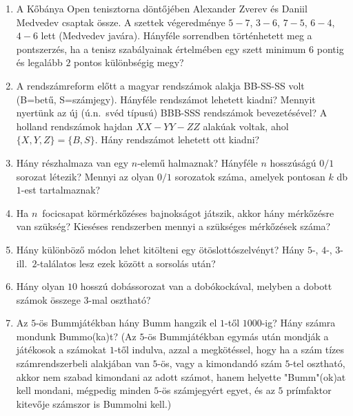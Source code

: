 \documentclass[a4paper,12pt]{article}
\begin{document}
\begin{enumerate}
        \item A Kőbánya Open tenisztorna döntőjében Alexander Zverev és Daniil Medvedev csaptak össze. A szettek végeredménye $5-7$, $3-6$, $7-5$, $6-4$, $4-6$ lett (Medvedev javára). Hányféle sorrendben történhetett meg a pontszerzés, ha a tenisz szabályainak értelmében egy szett minimum $6$ pontig és legalább $2$ pontos különbségig megy?

        \item
        A rendszámreform előtt a magyar rendszámok alakja BB-SS-SS volt (B=betű,
        S=számjegy). 
        Hányféle rendszámot lehetett kiadni? Mennyit nyertünk az új (ú.n.\ svéd
        típusú) BBB-SSS rendszámok bevezetésével? A holland rendszámok hajdan $XX-YY-ZZ$
        alakúak voltak, ahol $\{X,Y,Z\}=\{B,S\}$. Hány rendszámot lehetett ott kiadni?

        \item
        Hány részhalmaza van egy $n$-elemű halmaznak? Hányféle $n$ hosszúságú $0/1$
        sorozat létezik? Mennyi az olyan $0/1$ sorozatok száma, amelyek pontosan $k$
        db $1$-est tartalmaznak?

        \item
        Ha $n$\ focicsapat körmérkőzéses bajnokságot játszik, akkor hány mérkőzésre
        van szükség? Kieséses rendszerben mennyi a szükséges mérkőzések száma?

        \item
        Hány különböző módon lehet kitölteni egy ötöslottószelvényt? Hány
        $5$-, $4$-, $3$- ill.\ $2$-találatos lesz ezek között a sorsolás után?

        \item
        Hány olyan $10$ hosszú dobássorozat van a dobókockával, melyben a dobott
        számok összege $3$-mal osztható?

        \item
        Az $5$-ös Bummjátékban hány Bumm hangzik el $1$-től $1000$-ig? Hány számra
        mondunk Bummo(ka)t? (Az $5$-ös Bummjátékban egymás után mondják a játékosok a
        számokat $1$-től indulva, azzal a megkötéssel, hogy ha a szám tízes
        számrendszerbeli alakjában van $5$-ös, vagy a kimondandó szám $5$-tel
        osztható, akkor nem szabad kimondani az adott számot, hanem helyette
        "Bumm"(ok)at kell mondani, mégpedig minden $5$-ös számjegyért egyet, és
        az $5$ prímfaktor kitevője számszor is Bummolni kell.)


\end{enumerate}
\end{document}
